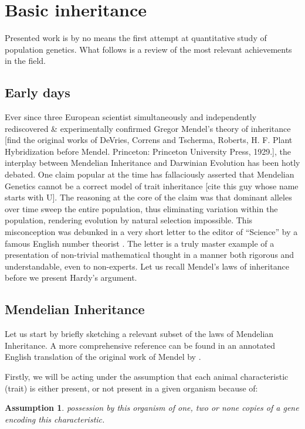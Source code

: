 \documentclass{l4proj}
\newtheorem{assum}{Assumption}
\begin{document}
\section{Basic inheritance}

Presented work is by no means the first attempt at quantitative study of population genetics. What follows is a review of the most relevant achievements in the field.

\subsection{Early days}
Ever since three European scientist simultaneously and independently rediscovered \& experimentally confirmed Gregor Mendel's theory of inheritance [find the original works of DeVries, Correns and Tscherma, Roberts, H. F. Plant Hybridization before Mendel. Princeton: Princeton University Press, 1929.], the interplay between Mendelian Inheritance and Darwinian Evolution has been hotly debated. One claim popular at the time has fallaciously asserted that Mendelian Genetics cannot be a correct model of trait inheritance [cite this guy whose name starts with U]. The reasoning at the core of the claim was that dominant alleles over time sweep the entire population, thus eliminating variation within the population, rendering evolution by natural selection impossible. This misconception was debunked in a very short letter to the editor of ``Science'' by a famous English number theorist \parencite{hardy08}. The letter is a truly master example of a presentation of non-trivial mathematical thought in a manner both rigorous and understandable, even to non-experts. Let us recall Mendel's laws of inheritance before we present Hardy's argument.

\subsection{Mendelian Inheritance}

Let us start by briefly sketching a relevant subset of the laws of Mendelian Inheritance. A more comprehensive reference can be found in an annotated English translation of the original work of Mendel by \cite{mendel}.

Firstly, we will be acting under the assumption that each animal characteristic (trait) is either present, or not present in a given organism because of:
\begin{assum}\label{genotypes}
  possession by this organism of one, two or none copies of a gene encoding this characteristic.
\end{assum}
\end{document}
